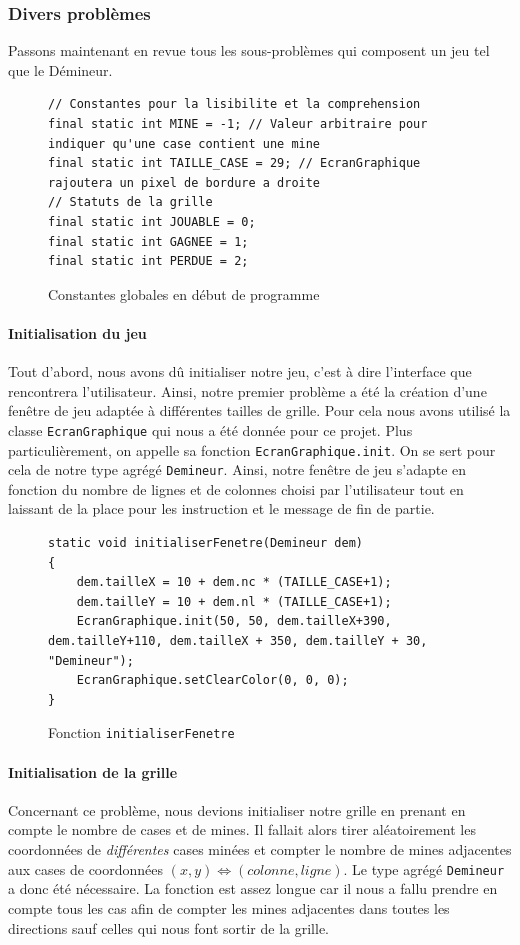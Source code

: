 \documentclass[a4paper, 12pt, oneside]{article}
\newcommand{\var}[1]{\texttt{#1}}
\begin{document}
\subsubsection{Divers problèmes}
Passons maintenant en revue tous les sous-problèmes qui composent un jeu tel que le Démineur.

\begin{figure}[hpt]
	\center
	\caption{\label{fig:constantes} Constantes globales en début de programme}
\begin{lstlisting}
// Constantes pour la lisibilite et la comprehension
final static int MINE = -1; // Valeur arbitraire pour indiquer qu'une case contient une mine
final static int TAILLE_CASE = 29; // EcranGraphique rajoutera un pixel de bordure a droite
// Statuts de la grille
final static int JOUABLE = 0;
final static int GAGNEE = 1;
final static int PERDUE = 2;
\end{lstlisting}
\end{figure}

\paragraph{Initialisation du jeu} Tout d'abord, nous avons dû initialiser notre jeu, c'est à dire l'interface que rencontrera l'utilisateur. Ainsi, notre premier problème a été la création d'une fenêtre de jeu adaptée à différentes tailles de grille. Pour cela nous avons utilisé la classe \var{EcranGraphique} qui nous a été donnée pour ce projet. Plus particulièrement, on appelle sa fonction \var{EcranGraphique.init}. On se sert pour cela de notre type agrégé \var{Demineur}. Ainsi, notre fenêtre de jeu s'adapte en fonction du nombre de lignes et de colonnes choisi par l'utilisateur tout en laissant de la place pour les instruction et le message de fin de partie.

\begin{figure}[hpt]
	\center
	\caption{\label{fig:fnInitialiserFenetre} Fonction \var{initialiserFenetre}}
\begin{lstlisting}
static void initialiserFenetre(Demineur dem)
{
	dem.tailleX = 10 + dem.nc * (TAILLE_CASE+1);
	dem.tailleY = 10 + dem.nl * (TAILLE_CASE+1);
	EcranGraphique.init(50, 50, dem.tailleX+390, dem.tailleY+110, dem.tailleX + 350, dem.tailleY + 30, "Demineur");
	EcranGraphique.setClearColor(0, 0, 0);
}
\end{lstlisting}
\end{figure} 

\paragraph{Initialisation de la grille} Concernant ce problème, nous devions initialiser notre grille en prenant en compte le nombre de cases et de mines. Il fallait alors tirer aléatoirement les coordonnées de \emph{différentes} cases minées et compter le nombre de mines adjacentes aux cases de coordonnées $(x,y) \iff (colonne, ligne)$. Le type agrégé \var{Demineur} a donc été nécessaire. La fonction est assez longue car il nous a fallu prendre en compte tous les cas afin de compter les mines adjacentes dans toutes les directions sauf celles qui nous font sortir de la grille.
\end{document}
